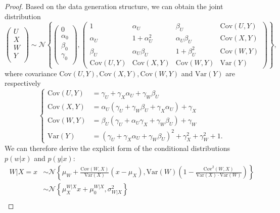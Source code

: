 \documentclass[10pt,a4paper]{amsart}
\def\cN{\mathcal{N}}
\begin{document}
\begin{proof}
Based on the data generation structure, we can obtain the joint distribution
$$
\left( \begin{array}{c}
	U\\
	X\\
	W\\
	Y\\
\end{array} \right) \sim \cN\left\{ \left( \begin{array}{c}
	0\\
	\alpha_0\\
	\beta_0\\
	\gamma_0\\
\end{array} \right) ,\left( \begin{matrix}
	1&		\alpha_U&		\beta_{U}&		\mathrm{Cov}(U,Y)\\
	\alpha_U&		1+\alpha_U^{2}&		\alpha_U\beta_{U}&		\mathrm{Cov}(X,Y)\\
	\beta_{U}&		\alpha_U\beta_{U}&		1+\beta_{U}^{2}&		\mathrm{Cov}(W,Y)\\
	\mathrm{Cov}(U,Y)&		\mathrm{Cov}(X,Y)&		\mathrm{Cov}(W,Y)&		\mathrm{Var}(Y)
\end{matrix} \right) \right\},
$$
where covariance $\mathrm{Cov}(U,Y),\mathrm{Cov}(X,Y),\mathrm{Cov}(W,Y)$ and $\mathrm{Var}(Y)$ are respectively
$$
\left\{ \begin{aligned}
	\mathrm{Cov}(U,Y)&=\gamma_{U}+\gamma_X\alpha_U+\gamma_W\beta_{U}\\
	\mathrm{Cov}(X,Y)&=\alpha_U\left( \gamma_{U}+\gamma_W\beta_{U}+\gamma_X\alpha_U \right) +\gamma_X\\
	\mathrm{Cov}(W,Y)&=\beta_{U}\left( \gamma_{U}+\alpha_U\gamma_X+\gamma_W\beta_{U} \right) +\gamma_W\\
	\mathrm{Var}(Y)&=(\gamma_{U}+\gamma_X\alpha_U+\gamma_W\beta_{U})^2+\gamma_X^{2}+\gamma_W^{2}+1.
\end{aligned} \right.
$$
We can therefore derive the explicit form of the conditional distributions $p(w|x)$ and $p(y|x)$:
$$
\begin{aligned}
	W|X=x&\sim \cN\left\{ \mu_W+\frac{\mathrm{Cov}(W,X)}{\mathrm{Var}(X)}(x-\mu_{X}),\mathrm{Var}(W)\left( 1-\frac{\mathrm{Cov}^2(W,X)}{\mathrm{Var}(X)\cdot \mathrm{Var}(W)} \right) \right\}\\
	&\sim \cN\left\{ \mu_{X}^{W|X}x+\mu_{0}^{W|X},\sigma_{W|X}^{2} \right\} 
\end{aligned}
$$
$$
\begin{aligned}

\end{aligned}$$
\end{proof}
\end{document}
